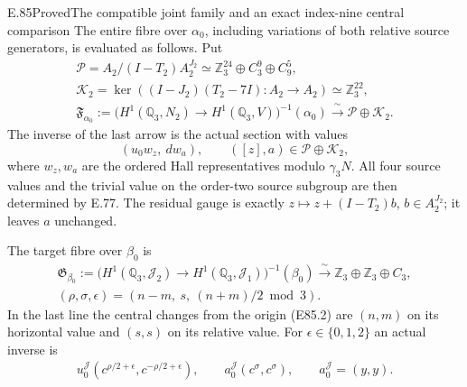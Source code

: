 \begin{statement}{E.85}{Proved}{The compatible joint family and an exact index-nine central comparison}
The entire fibre over $\alpha_0$, including variations
of both relative source generators, is evaluated as
follows. Put
\[
 \begin{gathered}
 \mathcal P=A_2/(I-T_2)A_2^{J_2}
       \simeq\mathbb Z_3^{24}\oplus C_3^9\oplus C_9^5,\\
 \mathcal K_2=\ker((I-J_2)(T_2-7I):A_2\to A_2)
       \simeq\mathbb Z_3^{22},\\
 \mathfrak F_{\alpha_0}:=
  \bigl(H^1(\mathbb Q_3,N_2)\to H^1(\mathbb Q_3,V)\bigr)^{-1}(\alpha_0)
       \xrightarrow{\ \sim\ }\mathcal P\oplus\mathcal K_2.
 \end{gathered}
 \tag{E85.6}
\]
The inverse of the last arrow is the actual section
with values
\[
             (u_0w_z,\ d w_a),
                 \qquad ([z],a)\in\mathcal P\oplus\mathcal K_2,
 \tag{E85.7}
\]
where $w_z,w_a$ are the ordered Hall representatives
modulo $\gamma_3N$. All four source values and the
trivial value on the order-two source subgroup are
then determined by E.77. The residual gauge is exactly
$z\mapsto z+(I-T_2)b$, $b\in A_2^{J_2}$; it leaves
$a$ unchanged.

The target fibre over $\beta_0$ is
\[
 \begin{gathered}
 \mathfrak G_{\beta_0}:=
  \bigl(H^1(\mathbb Q_3,\mathcal J_2)
          \to H^1(\mathbb Q_3,\mathcal J_1)\bigr)^{-1}(\beta_0)
       \xrightarrow{\ \sim\ }
             \mathbb Z_3\oplus\mathbb Z_3\oplus C_3,\\
   (\rho,\sigma,\epsilon)
        =(n-m,\ s,\ (n+m)/2\bmod3).
 \end{gathered}
 \tag{E85.8}
\]
In the last line the central changes from the
origin (E85.2) are $(n,m)$ on its horizontal value
and $(s,s)$ on its relative value. For
$\epsilon\in\{0,1,2\}$ an actual inverse is
\[
 \begin{gathered}
 u_0^{\mathcal J}
       (c^{\rho/2+\epsilon},c^{-\rho/2+\epsilon}),\qquad
 a_0^{\mathcal J}(c^\sigma,c^\sigma),\qquad
 a_0^{\mathcal J}=(y,y).
 \end{gathered}
 \tag{E85.9}
\]


\end{statement}
